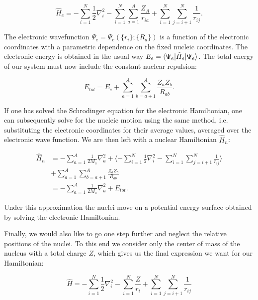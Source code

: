\begin{equation}
    \hat{H}_e = -\sum_{i=1}^N \frac{1}{2} \nabla_i^2
    -\sum_{i=1}^N \sum_{a=1}^A \frac{Z_A}{r_{ia}}
    +\sum_{i=1}^N \sum_{j=i+1}^N \frac{1}{r_{ij}} .
\end{equation}

The electronic wavefunction $\Psi_e = \Psi_e(\{r_i\}; \{R_a\})$
is a function of the electronic coordinates with a parametric dependence
on the fixed nucleic coordinates. The electronic energy
is obtained in the usual way $E_{e} = \braket{\Psi_e | \hat{H}_e |
\Psi_e} $. The total energy of our system
must now include the constant nuclear repulsion:

$$ E_{tot} = E_{e} + \sum_{a=1}^A \sum_{b=a+1}^A
    \frac{Z_a Z_b}{R_{ab}} . $$

If one has solved the Schrodinger equation for the electronic
Hamiltonian, one can subsequently solve for the nucleic motion
using the same method, i.e. substituting the electronic coordinates
for their average values, averaged over the electronic wave function.
We are then left with a nuclear Hamiltonian $\hat{H}_n$:

\begin{equation}
    \begin{split}
        \hat{H}_n 
        &= -\sum_{a=1}^A \frac{1}{2 M_a} \nabla_a^2
        + \langle -\sum_{i=1}^N \frac{1}{2} \nabla_i^2
        - \sum_{i=1}^N \sum_{j=i+1}^N \frac{1}{r_{ij}}
        \rangle \\
        &+ \sum_{a=1}^A \sum_{b=a+1}^A
        \frac{Z_a Z_b}{R_{ab}} \\
        &= -\sum_{a=1}^A \frac{1}{2 M_a} \nabla_a^2
        + E_{tot} .
    \end{split}
\end{equation}

Under this approximation the nuclei move on a potential energy
surface obtained by solving the electronic Hamiltonian.
\par
Finally, we would also like to go one step further and neglect
the relative positions of the nuclei. To this end we consider only the
center of mass of the nucleus with a total charge $Z$,
which gives us the final expression we want for our Hamiltonian:

\begin{equation}
    \hat{H} = -\sum_{i=1}^N \frac{1}{2} \nabla_i^2
    - \sum_{i=1}^N \frac{Z}{r_{i}} + \sum_{i=1}^N \sum_{j=i+1}^N
    \frac{1}{r_{ij}}
\end{equation}

